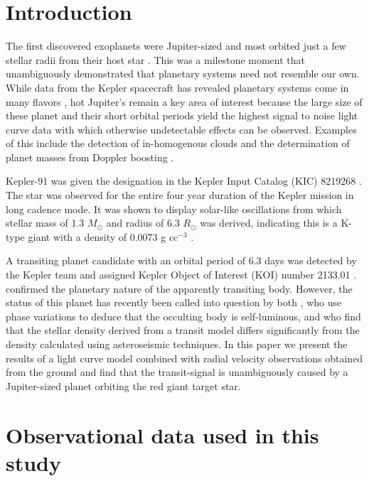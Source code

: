\documentclass[apjl]{emulateapj}
\begin{document}
\section{Introduction}
The first discovered exoplanets were Jupiter-sized \citep{campbell88} and most orbited just a few stellar radii from their host star \citep{mayor95,marcy96}. This was a milestone moment that unambiguously demonstrated that planetary systems need not resemble our own. While data from the Kepler spacecraft has revealed planetary systems come in many flavors \citep[e.g.][]{lissauer11,carter12,barclay13}, hot Jupiter's remain a key area of interest because the large size of these planet and their short orbital periods yield the highest signal to noise light curve data with which otherwise undetectable effects can be observed. Examples of this include the detection of in-homogenous clouds \citep{demory13} and the determination of planet masses from Doppler boosting \citep{shporer11,barclay12}.

Kepler-91 was given the designation in the Kepler Input Catalog (KIC) 8219268 \citep{brown11}. The star was observed for the entire four year duration of the Kepler mission in long cadence mode. It was shown to display solar-like oscillations from which stellar mass of 1.3 $M_\odot$ and radius of 6.3 $R_\odot$ was derived, indicating this is a K-type giant with a density of 0.0073 g cc$^{-3}$ \citep{huber13,lillo14}.

A transiting planet candidate with an orbital period of 6.3 days was detected by the Kepler team and assigned Kepler Object of Interest (KOI) number 2133.01 \citep{batalha12}. \citet{lillo14} confirmed the planetary nature of the apparently transiting body. However, the status of this planet has recently been called into question by both \citet{esteves13}, who use phase variations to deduce that the occulting body is self-luminous, and \citet{sliski14} who find that the stellar density derived from a transit model differs significantly from the density calculated using asteroseismic techniques. In this paper we present the results of a light curve model combined with radial velocity observations obtained from the ground and find that the transit-signal is unambiguously caused by a Jupiter-sized planet orbiting the red giant target star.


\section{Observational data used in this study}
\end{document}
